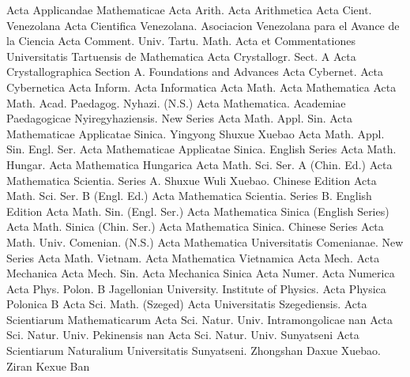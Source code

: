 {Acta Applicandae Mathematicae}
{Acta Arith.}
{Acta Arithmetica}
{Acta Cient. Venezolana}
{Acta Cientifica Venezolana. Asociacion Venezolana para el Avance de la Ciencia}
{Acta Comment. Univ. Tartu. Math.}
{Acta et Commentationes Universitatis Tartuensis de Mathematica}
{Acta Crystallogr. Sect. A}
{Acta Crystallographica Section A. Foundations and Advances}
{Acta Cybernet.}
{Acta Cybernetica}
{Acta Inform.}
{Acta Informatica}
{Acta Math.}
{Acta Mathematica}
{Acta Math. Acad. Paedagog. Nyhazi. (N.S.)}
{Acta Mathematica. Academiae Paedagogicae Nyiregyhaziensis. New Series}
{Acta Math. Appl. Sin.}
{Acta Mathematicae Applicatae Sinica. Yingyong Shuxue Xuebao}
{Acta Math. Appl. Sin. Engl. Ser.}
{Acta Mathematicae Applicatae Sinica. English Series}
{Acta Math. Hungar.}
{Acta Mathematica Hungarica}
{Acta Math. Sci. Ser. A (Chin. Ed.)}
{Acta Mathematica Scientia. Series A. Shuxue Wuli Xuebao. Chinese Edition}
{Acta Math. Sci. Ser. B (Engl. Ed.)}
{Acta Mathematica Scientia. Series B. English Edition}
{Acta Math. Sin. (Engl. Ser.)}
{Acta Mathematica Sinica (English Series)}
{Acta Math. Sinica (Chin. Ser.)}
{Acta Mathematica Sinica. Chinese Series}
{Acta Math. Univ. Comenian. (N.S.)}
{Acta Mathematica Universitatis Comenianae. New Series}
{Acta Math. Vietnam.}
{Acta Mathematica Vietnamica}
{Acta Mech.}
{Acta Mechanica}
{Acta Mech. Sin.}
{Acta Mechanica Sinica}
{Acta Numer.}
{Acta Numerica}
{Acta Phys. Polon. B}
{Jagellonian University. Institute of Physics. Acta Physica Polonica B}
{Acta Sci. Math. (Szeged)}
{Acta Universitatis Szegediensis. Acta Scientiarum Mathematicarum}
{Acta Sci. Natur. Univ. Intramongolicae}
{nan}
{Acta Sci. Natur. Univ. Pekinensis}
{nan}
{Acta Sci. Natur. Univ. Sunyatseni}
{Acta Scientiarum Naturalium Universitatis Sunyatseni. Zhongshan Daxue Xuebao. Ziran Kexue Ban}
